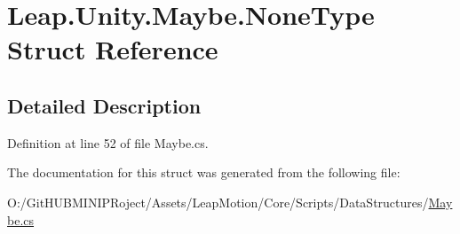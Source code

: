 \hypertarget{struct_leap_1_1_unity_1_1_maybe_1_1_none_type}{}\section{Leap.\+Unity.\+Maybe.\+None\+Type Struct Reference}
\label{struct_leap_1_1_unity_1_1_maybe_1_1_none_type}


\subsection{Detailed Description}


Definition at line 52 of file Maybe.\+cs.



The documentation for this struct was generated from the following file\+:\begin{DoxyCompactItemize}
\item 
O\+:/\+Git\+H\+U\+B\+M\+I\+N\+I\+P\+Roject/\+Assets/\+Leap\+Motion/\+Core/\+Scripts/\+Data\+Structures/\mbox{\hyperlink{_maybe_8cs}{Maybe.\+cs}}\end{DoxyCompactItemize}
